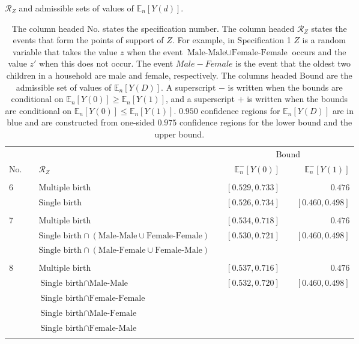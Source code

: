 \documentclass[12pt,a4paper,twoside]{article}
\renewcommand{\baselinestretch}{1.5}
\numberwithin{equation}{section}
\begin{document}
\begin{sidewaystable}[p]
\centering
\caption{$\mathcal{R}_Z$ and admissible sets of values of $\mathbb{E}_n[Y(d)]$.}
\begin{tabular}{lclcrcr}
\toprule
&	&  & &\multicolumn{3}{c}{Bound} \\
\cmidrule(r){4-7}	
No. & &	$\mathcal{R}_Z$	&	&	$\mathbb{E}_n^-[Y(0)]$	&	&	$\mathbb{E}_n^-[Y(1)]$\\
\midrule
& &\phantom{$\text{Male-Female}\cup\text{Female-Male}\cup\text{Female-Female}$}\\
6& &$\text{Multiple birth}$&	&	$[0.529,0.733]$	&	&	$0.476$\\
& &$\text{Single birth}$& &\color{blue}$[0.526,0.734]$	&	&	\color{blue}$[0.460,0.498]$\\
\\
7& &$\text{Multiple birth}$&	&	$[0.534,0.718]$	&	&	$0.476$\\
& &$\text{Single birth}\cap(\text{Male-Male}\cup\text{Female-Female})$& &\color{blue}$[0.530,0.721]$	&	&	\color{blue}$[0.460,0.498]$\\
& &$\text{Single birth}\cap(\text{Male-Female}\cup\text{Female-Male})$\\
\\
8& &$\text{Multiple birth}$&	&	$[0.537,0.716]$	&	&	$0.476$\\
& &$\text{Single birth}\cap\text{Male-Male}$& &\color{blue}$[0.532,0.720]$	&	&	\color{blue}$[0.460,0.498]$\\
& &$\text{Single birth}\cap\text{Female-Female}$\\
& &$\text{Single birth}\cap\text{Male-Female}$ \\
& &$\text{Single birth}\cap\text{Female-Male}$\\
	\\
\bottomrule
\end{tabular}
\vspace{10pt}
\renewcommand{\baselinestretch}{1.5}
\caption*{\scriptsize The column headed No. states the specification number. The column headed $\mathcal{R}_Z$ states the events that form the points of support of $Z$. For example, in Specification 1 $Z$ is a random variable that takes the value $z$ when the event $\text{Male-Male}\cup\text{Female-Female}$ occurs and the value $z'$ when this does not occur. The event $Male-Female$ is the event that the oldest two children in a household are male and female, respectively. The columns headed Bound are the admissible set of values of $\mathbb{E}_n[Y(D)]$. A superscript $-$ is written when the bounds are conditional on $\mathbb{E}_n[Y(0)]\geq\mathbb{E}_n[Y(1)]$, and a superscript $+$ is written when the bounds are conditional on $\mathbb{E}_n[Y(0)]\leq\mathbb{E}_n[Y(1)]$. $0.950$ confidence regions for $\mathbb{E}_n[Y(D)]$ are in blue and are constructed from one-sided $0.975$ confidence regions for the lower bound and the upper bound.}
\label{tbl:setsmult}
\end{sidewaystable}
\end{document}
